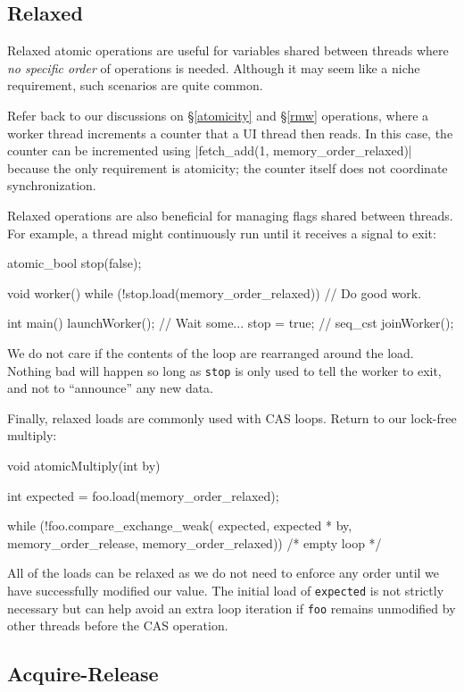 \documentclass[fontsize=10pt, oneside]{scrartcl}
\newcommand{\secref}[1]{\hyperref[#1]{\textsc{\S}\ref*{#1}}}
\begin{document}
\subsection{Relaxed}
Relaxed atomic operations are useful for variables shared between threads where \emph{no specific order} of operations is needed.
Although it may seem like a niche requirement, such scenarios are quite common.

Refer back to our discussions on \secref{atomicity} and \secref{rmw} operations,
where a worker thread increments a counter that a \textsc{UI} thread then reads.
In this case, the counter can be incremented using \cc|fetch_add(1, memory_order_relaxed)| because the only requirement is atomicity;
the counter itself does not coordinate synchronization.

Relaxed operations are also beneficial for managing flags shared between threads.
For example, a thread might continuously run until it receives a signal to exit:
\begin{cppcode}
atomic_bool stop(false);

void worker()
{
    while (!stop.load(memory_order_relaxed)) {
        // Do good work.
    }
}

int main()
{
    launchWorker();
    // Wait some...
    stop = true; // seq_cst
    joinWorker();
}
\end{cppcode}
We do not care if the contents of the loop are rearranged around the load.
Nothing bad will happen so long as \texttt{stop} is only used to tell the worker to exit, and not to ``announce'' any new data.

Finally, relaxed loads are commonly used with \textsc{CAS} loops.
Return to our lock-free multiply:
\begin{cppcode}
void atomicMultiply(int by)
{
    int expected = foo.load(memory_order_relaxed);

    while (!foo.compare_exchange_weak(
        expected, expected * by,
        memory_order_release,
        memory_order_relaxed)) {
        /* empty loop */
    }
}
\end{cppcode}
All of the loads can be relaxed as we do not need to enforce any order until we have successfully modified our value.
The initial load of \texttt{expected} is not strictly necessary but can help avoid an extra loop iteration if \texttt{foo} remains unmodified by other threads before the \textsc{CAS} operation.

\subsection{Acquire-Release}
\end{document}
